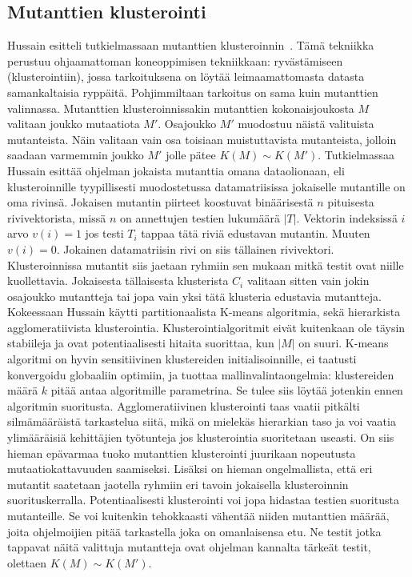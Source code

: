 \documentclass{tktltiki}
\begin{document}
\subsection{Mutanttien klusterointi}
Hussain esitteli tutkielmassaan mutanttien klusteroinnin~\cite{Hussain08}. Tämä tekniikka perustuu ohjaamattoman koneoppimisen tekniikkaan: ryvästämiseen (klusterointiin), jossa tarkoituksena on löytää leimaamattomasta datasta samankaltaisia ryppäitä. Pohjimmiltaan tarkoitus on sama kuin mutanttien valinnassa. Mutanttien klusteroinnissakin mutanttien kokonaisjoukosta $M$ valitaan joukko mutaatiota $M'$. Osajoukko $M'$ muodostuu näistä valituista mutanteista. Näin valitaan vain osa toisiaan muistuttavista mutanteista, jolloin saadaan varmemmin joukko $M'$ jolle pätee $K(M) \sim K(M')$. Tutkielmassaa Hussain esittää ohjelman jokaista mutanttia omana dataolionaan, eli klusteroinnille tyypillisesti muodostetussa datamatriisissa jokaiselle mutantille on oma rivinsä. Jokaisen mutantin piirteet koostuvat binäärisestä $n$ pituisesta rivivektorista, missä $n$ on annettujen testien lukumäärä $|T|$. Vektorin indeksissä $i$ arvo $v(i) = 1$ jos testi $T_i$ tappaa tätä riviä edustavan mutantin. Muuten $v(i) = 0$. Jokainen datamatriisin rivi on siis tällainen rivivektori. Klusteroinnissa mutantit siis jaetaan ryhmiin sen mukaan mitkä testit ovat niille kuollettavia. Jokaisesta tällaisesta klusterista $C_{i}$ valitaan sitten vain jokin osajoukko mutantteja tai jopa vain yksi tätä klusteria edustavia mutantteja. Kokeessaan Hussain käytti partitionaalista K-means algoritmia, sekä hierarkista agglomeratiivista klusterointia. Klusterointialgoritmit eivät kuitenkaan ole täysin stabiileja ja ovat potentiaalisesti hitaita suorittaa, kun $|M|$ on suuri. K-means algoritmi on hyvin sensitiivinen klustereiden initialisoinnille, ei taatusti konvergoidu globaaliin optimiin, ja tuottaa mallinvalintaongelmia: klustereiden määrä $k$ pitää antaa algoritmille parametrina. Se tulee siis löytää jotenkin ennen algoritmin suoritusta. Agglomeratiivinen klusterointi taas vaatii pitkälti silmämääräistä tarkastelua siitä, mikä on mielekäs hierarkian taso ja voi vaatia ylimääräisiä kehittäjien työtunteja jos klusterointia suoritetaan useasti. On siis hieman epävarmaa tuoko mutanttien klusterointi juurikaan nopeutusta mutaatiokattavuuden saamiseksi. Lisäksi on hieman ongelmallista, että eri mutantit saatetaan jaotella ryhmiin eri tavoin jokaisella klusteroinnin suorituskerralla. Potentiaalisesti klusterointi voi jopa hidastaa testien suoritusta mutanteille. Se voi kuitenkin tehokkaasti vähentää niiden mutanttien määrää, joita ohjelmoijien pitää tarkastella joka on omanlaisensa etu. Ne testit jotka tappavat näitä valittuja mutantteja ovat ohjelman kannalta tärkeät testit, olettaen $K(M) \sim K(M')$.
\end{document}
